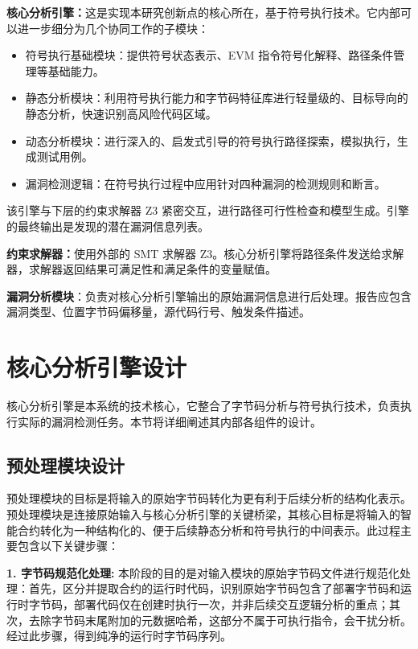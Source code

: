 \documentclass[print, master, vlined, timesmath]{DissertUESTC}
\begin{document}
\textbf{核心分析引擎：}这是实现本研究创新点的核心所在，基于符号执行技术。它内部可以进一步细分为几个协同工作的子模块：

\begin{itemize}
    \item 符号执行基础模块：提供符号状态表示、EVM 指令符号化解释、路径条件管理等基础能力。
    \item 静态分析模块：利用符号执行能力和字节码特征库进行轻量级的、目标导向的静态分析，快速识别高风险代码区域。
    \item 动态分析模块：进行深入的、启发式引导的符号执行路径探索，模拟执行，生成测试用例。
    \item 漏洞检测逻辑：在符号执行过程中应用针对四种漏洞的检测规则和断言。
\end{itemize}


该引擎与下层的约束求解器 Z3 紧密交互，进行路径可行性检查和模型生成。引擎的最终输出是发现的潜在漏洞信息列表。

\textbf{约束求解器：}使用外部的 SMT 求解器 Z3。核心分析引擎将路径条件发送给求解器，求解器返回结果可满足性和满足条件的变量赋值。

\textbf{漏洞分析模块}：负责对核心分析引擎输出的原始漏洞信息进行后处理。报告应包含漏洞类型、位置字节码偏移量，源代码行号、触发条件描述。


\section{核心分析引擎设计}

核心分析引擎是本系统的技术核心，它整合了字节码分析与符号执行技术，负责执行实际的漏洞检测任务。本节将详细阐述其内部各组件的设计。

\subsection{预处理模块设计}

预处理模块的目标是将输入的原始字节码转化为更有利于后续分析的结构化表示。
预处理模块是连接原始输入与核心分析引擎的关键桥梁，其核心目标是将输入的智能合约转化为一种结构化的、便于后续静态分析和符号执行的中间表示。此过程主要包含以下关键步骤：


\textbf{1. 字节码规范化处理:}
本阶段的目的是对输入模块的原始字节码文件进行规范化处理：首先，区分并提取合约的运行时代码，识别原始字节码包含了部署字节码和运行时字节码，部署代码仅在创建时执行一次，并非后续交互逻辑分析的重点；其次，去除字节码末尾附加的元数据哈希，这部分不属于可执行指令，会干扰分析。经过此步骤，得到纯净的运行时字节码序列。
\end{document}
